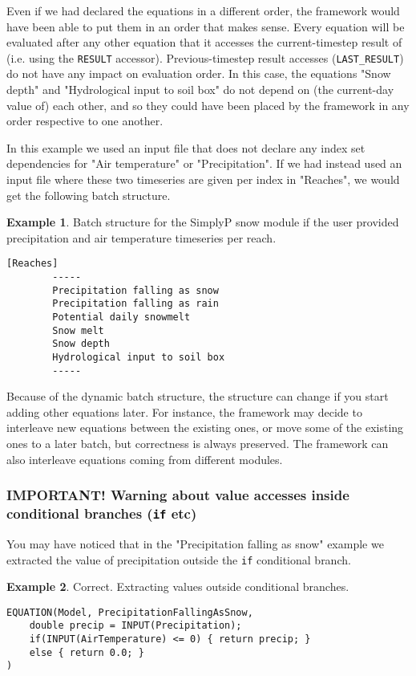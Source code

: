 \documentclass[11pt]{article}
\theoremstyle{definition}
\newtheorem{myexample}{Example}
\newenvironment{example}%
  {\begin{lrbox}{\examplebox}%
   \begin{minipage}{\dimexpr\linewidth-2\fboxsep}
   \begin{myexample}}%
  {\end{myexample}%
   \end{minipage}%
   \end{lrbox}%
   \begin{trivlist}
     \item[]\colorbox{silver}{\usebox\examplebox}
   \end{trivlist}}
\begin{document}
Even if we had declared the equations in a different order, the framework would have been able to put them in an order that makes sense. Every equation will be evaluated after any other equation that it accesses the current-timestep result of (i.e. using the {\tt RESULT} accessor). Previous-timestep result accesses ({\tt LAST\_RESULT}) do not have any impact on evaluation order. In this case, the equations "Snow depth" and "Hydrological input to soil box" do not depend on (the current-day value of) each other, and so they could have been placed by the framework in any order respective to one another.

In this example we used an input file that does not declare any index set dependencies for "Air temperature" or "Precipitation". If we had instead used an input file where these two timeseries are given per index in "Reaches", we would get the following batch structure.

\begin{example}
Batch structure for the SimplyP snow module if the user provided precipitation and air temperature timeseries per reach.
\begin{lstlisting}[style=textstyle]
[Reaches]
        -----
        Precipitation falling as snow
        Precipitation falling as rain
        Potential daily snowmelt
        Snow melt
        Snow depth
        Hydrological input to soil box
        -----
\end{lstlisting}
\end{example}

Because of the dynamic batch structure, the structure can change if you start adding other equations later. For instance, the framework may decide to interleave new equations between the existing ones, or move some of the existing ones to a later batch, but correctness is always preserved. The framework can also interleave equations coming from different modules.

\subsubsection{IMPORTANT! Warning about value accesses inside conditional branches ({\tt if} etc)}

You may have noticed that in the "Precipitation falling as snow" example we extracted the value of precipitation outside the {\tt if} conditional branch.

\begin{example}\label{ex:simplypequations}
Correct. Extracting values outside conditional branches.
\begin{lstlisting}[style=mycpp]
EQUATION(Model, PrecipitationFallingAsSnow,
	double precip = INPUT(Precipitation);
	if(INPUT(AirTemperature) <= 0) { return precip; }
	else { return 0.0; }
)
\end{lstlisting}
\end{example}
\end{document}
